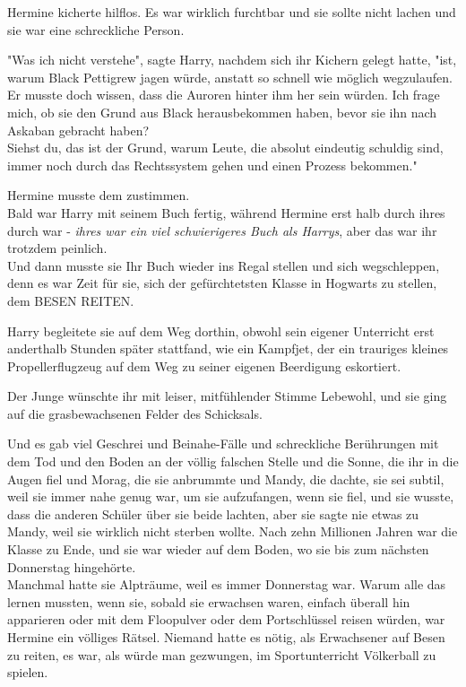 {Hermine kicherte hilflos. Es war wirklich furchtbar und sie sollte nicht lachen und sie war eine schreckliche Person.

"Was ich nicht verstehe", sagte Harry, nachdem sich ihr Kichern gelegt hatte, "ist, warum Black Pettigrew jagen würde, anstatt so schnell wie möglich wegzulaufen.\\ Er musste doch wissen, dass die Auroren hinter ihm her sein würden. Ich frage mich, ob sie den Grund aus Black herausbekommen haben, bevor sie ihn nach Askaban gebracht haben?\\ Siehst du, das ist der Grund, warum Leute, die absolut eindeutig schuldig sind, immer noch durch das Rechtssystem gehen und einen Prozess bekommen."

Hermine musste dem zustimmen.\\ Bald war Harry mit seinem Buch fertig, während Hermine erst halb durch ihres durch war - \emph{ihres war ein viel schwierigeres Buch als Harrys}, aber das war ihr trotzdem peinlich.\\ Und dann musste sie Ihr Buch wieder ins Regal stellen und sich wegschleppen, denn es war Zeit für sie, sich der gefürchtetsten Klasse in Hogwarts zu stellen, dem BESEN REITEN.

Harry begleitete sie auf dem Weg dorthin, obwohl sein eigener Unterricht erst anderthalb Stunden später stattfand, wie ein Kampfjet, der ein trauriges kleines Propellerflugzeug auf dem Weg zu seiner eigenen Beerdigung eskortiert.

Der Junge wünschte ihr mit leiser, mitfühlender Stimme Lebewohl, und sie ging auf die grasbewachsenen Felder des Schicksals.

Und es gab viel Geschrei und Beinahe-Fälle und schreckliche Berührungen mit dem Tod und den Boden an der völlig falschen Stelle und die Sonne, die ihr in die Augen fiel und Morag, die sie anbrummte und Mandy, die dachte, sie sei subtil, weil sie immer nahe genug war, um sie aufzufangen, wenn sie fiel, und sie wusste, dass die anderen Schüler über sie beide lachten, aber sie sagte nie etwas zu Mandy, weil sie wirklich nicht sterben wollte. Nach zehn Millionen Jahren war die Klasse zu Ende, und sie war wieder auf dem Boden, wo sie bis zum nächsten Donnerstag hingehörte.\\ Manchmal hatte sie Alpträume, weil es immer Donnerstag war. Warum alle das lernen mussten, wenn sie, sobald sie erwachsen waren, einfach überall hin apparieren oder mit dem Floopulver oder dem Portschlüssel reisen würden, war Hermine ein völliges Rätsel. Niemand hatte es nötig, als Erwachsener auf Besen zu reiten, es war, als würde man gezwungen, im Sportunterricht Völkerball zu spielen.

}
